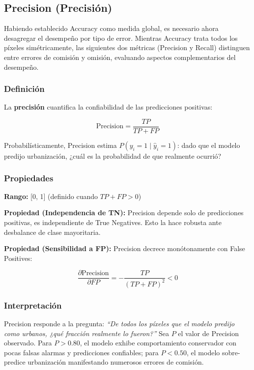 \subsection{Precision (Precisión)}

Habiendo establecido Accuracy como medida global, es necesario ahora desagregar el desempeño por tipo de error. Mientras Accuracy trata todos los píxeles simétricamente, las siguientes dos métricas (Precision y Recall) distinguen entre errores de comisión y omisión, evaluando aspectos complementarios del desempeño.

\subsubsection{Definición}

La \textbf{precisión} cuantifica la confiabilidad de las predicciones positivas:

\begin{equation}
\text{Precision} = \frac{TP}{TP + FP}
\label{eq:precision}
\end{equation}

Probabilísticamente, Precision estima $P(y_i = 1 \mid \hat{y}_i = 1)$: dado que el modelo predijo urbanización, ¿cuál es la probabilidad de que realmente ocurrió?

\subsubsection{Propiedades}

\textbf{Rango:} [0, 1] (definido cuando $TP + FP > 0$)

\textbf{Propiedad (Independencia de TN):} Precision depende solo de predicciones positivas, es independiente de True Negatives. Esto la hace robusta ante desbalance de clase mayoritaria.

\textbf{Propiedad (Sensibilidad a FP):} Precision decrece monótonamente con False Positives:

\begin{equation}
\frac{\partial \text{Precision}}{\partial FP} = -\frac{TP}{(TP + FP)^2} < 0
\label{eq:prec_fp_sens}
\end{equation}

\subsubsection{Interpretación}

Precision responde a la pregunta: \textit{``De todos los píxeles que el modelo predijo como urbanos, ¿qué fracción realmente lo fueron?''} Sea $P$ el valor de Precision observado. Para $P > 0.80$, el modelo exhibe comportamiento conservador con pocas falsas alarmas y predicciones confiables; para $P < 0.50$, el modelo sobre-predice urbanización manifestando numerosos errores de comisión.

